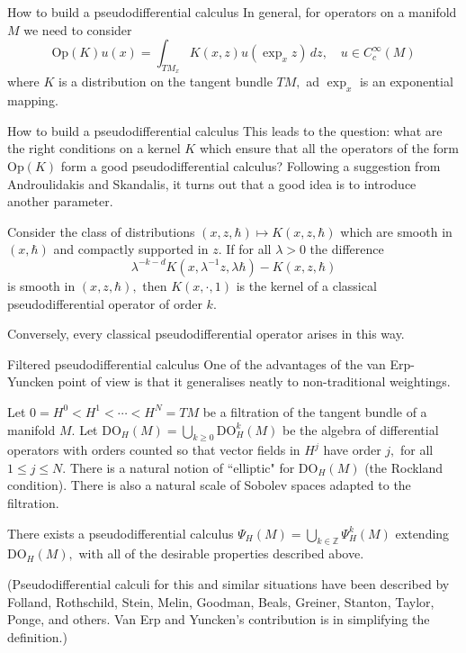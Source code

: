 \documentclass{beamer}
\numberwithin{equation}{section}
\theoremstyle{plain}
\theoremstyle{plain}
\theoremstyle{definition}
\theoremstyle{plain}
\theoremstyle{plain}
\theoremstyle{definition}
\newcommand{\Itgr}{\mathbb{Z}}
\newcommand{\Op}{\mathrm{Op}}
\begin{document}
\begin{frame}{How to build a pseudodifferential calculus}
    In general, for operators on a manifold $M$ we need to consider
    \[
        \Op(K)u(x) = \int_{TM_x} K(x,z)u(\exp_xz)\,dz,\quad u\in C^\infty_c(M)
    \]
    where $K$ is a distribution on the tangent bundle $TM,$ ad $\exp_x$ is an exponential mapping.
\end{frame}

\begin{frame}{How to build a pseudodifferential calculus}
    This leads to the question: what are the right conditions on a kernel $K$ which ensure that all the operators of the form $\Op(K)$ form a good pseudodifferential calculus? \pause
    Following a suggestion from Androulidakis and Skandalis, it turns out that a good idea is to introduce another parameter.
    \begin{theorem}
        Consider the class of distributions $(x,z,\hbar) \mapsto K(x,z,\hbar)$ which are smooth in $(x,\hbar)$ and compactly supported in $z.$ If for all $\lambda>0$ the difference
        \[
            \lambda^{-k-d}K(x,\lambda^{-1}z,\lambda \hbar)-K(x,z,\hbar)
        \]
        is smooth in $(x,z,\hbar),$ then $K(x,\cdot,1)$ is the kernel of a classical pseudodifferential operator of order $k.$
        
        Conversely, every classical pseudodifferential operator arises in this way.
    \end{theorem}
\end{frame}

\begin{frame}{Filtered pseudodifferential calculus}
    One of the advantages of the van Erp-Yuncken point of view is that it generalises neatly to non-traditional weightings. 
    \pause
    
    Let $0=H^0<H^1 < \cdots < H^N = TM$ be a filtration of the tangent bundle of a manifold $M.$ Let $\mathrm{DO}_H(M) = \bigcup_{k\geq 0} \mathrm{DO}_H^k(M)$ be the algebra of differential operators with orders counted so that vector fields in $H^j$ have order $j,$ for all $1\leq j\leq N.$ There is a natural notion of ``elliptic" for $\mathrm{DO}_H(M)$ (the Rockland condition). There is also a natural scale of Sobolev spaces adapted to the filtration.
        \pause
    \begin{theorem}
        There exists a pseudodifferential calculus $\Psi_H(M) = \bigcup_{k\in \Itgr} \Psi^k_H(M)$ extending $\mathrm{DO}_H(M),$ 
        with all of the desirable properties described above.
    \end{theorem}
    \pause
    (Pseudodifferential calculi for this and similar situations have been described by Folland, Rothschild, Stein, Melin, Goodman, Beals, Greiner, Stanton, Taylor, Ponge, and others. Van Erp and Yuncken's contribution is in simplifying the definition.)
\end{frame}
\end{document}
